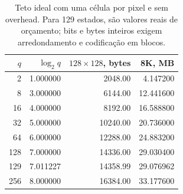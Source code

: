 \begin{table}[htbp]
\centering\small
\begin{tabular}{rrrr}
\toprule
$q$ & $\log_2q$ & $128\times128$, bytes & 8K, MB\\
\midrule
2 & 1.000000 & 2048.00 & 4.147200\\
8 & 3.000000 & 6144.00 & 12.441600\\
16 & 4.000000 & 8192.00 & 16.588800\\
32 & 5.000000 & 10240.00 & 20.736000\\
64 & 6.000000 & 12288.00 & 24.883200\\
128 & 7.000000 & 14336.00 & 29.030400\\
129 & 7.011227 & 14358.99 & 29.076962\\
256 & 8.000000 & 16384.00 & 33.177600\\
\bottomrule
\end{tabular}
\caption{Teto ideal com uma célula por pixel e sem overhead. Para 129 estados, são valores reais de orçamento; bits e bytes inteiros exigem arredondamento e codificação em blocos.}
\end{table}
